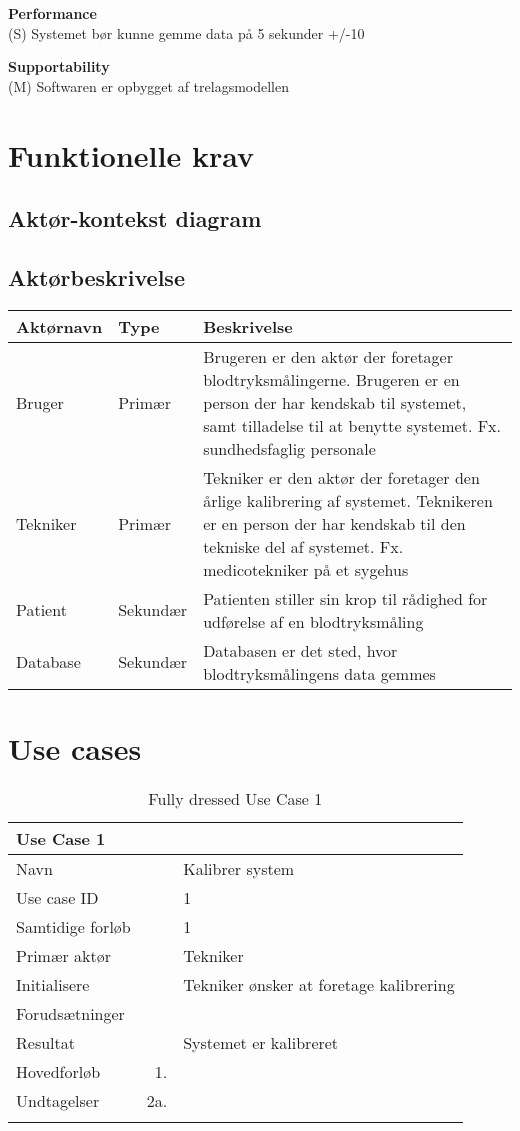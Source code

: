 \textbf{Performance}\\
(S) Systemet bør kunne gemme data på 5 sekunder +/-10%

\textbf{Supportability}\\
(M) Softwaren er opbygget af trelagsmodellen\\


\section{Funktionelle krav}
\subsection{Aktør-kontekst diagram}
\subsection{Aktørbeskrivelse}
\begin{longtabu}to 
	{\large \textbf{Aktørnavn}} & {\large \textbf{Type}} & {\large \textbf{Beskrivelse}}\\ \toprule
	Bruger & Primær & Brugeren er den aktør der foretager blodtryksmålingerne. Brugeren er en person der har kendskab til systemet, samt tilladelse til at benytte systemet. Fx. sundhedsfaglig personale \\
	Tekniker & Primær & Tekniker er den aktør der foretager den årlige kalibrering af systemet. Teknikeren er en person der har kendskab til den tekniske del af systemet. Fx. medicotekniker på et sygehus\\
	Patient & Sekundær & Patienten stiller sin krop til rådighed for udførelse af en blodtryksmåling\\
	Database & Sekundær & Databasen er det sted, hvor blodtryksmålingens data gemmes
	
	
\end{longtabu}

\section{Use cases}

\begin{longtabu} to  %
    {\large \textbf{Use Case 1}} && \\
    \toprule
    Navn &&    Kalibrer system\\
    Use case ID &&    1\\
    Samtidige forløb &&    1\\
    Primær aktør &&    Tekniker\\
    Initialisere &&    Tekniker ønsker at foretage kalibrering\\
    Forudsætninger &&  \\
    Resultat &&    Systemet er kalibreret                     \\ \midrule
    Hovedforløb &    1. &      \\ \midrule
                
    Undtagelser &    2a. &    \\ \bottomrule
\caption{Fully dressed Use Case 1}
\label{UC1}
\end{longtabu}

